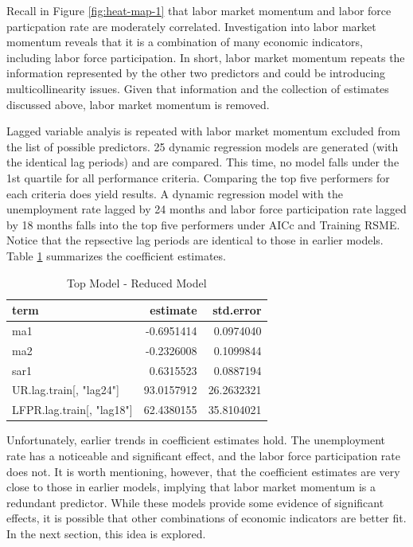 \documentclass[12pt,letterpaper,toc=flat,oneside]{report}
\theoremstyle{definition}
\theoremstyle{definition}
\theoremstyle{definition}
\theoremstyle{remark}
\begin{document}
Recall in Figure \ref{fig:heat-map-1} that labor market momentum and
labor force particpation rate are moderately correlated. Investigation
into labor market momentum reveals that it is a combination of many
economic indicators, including labor force participation. In short,
labor market momentum repeats the information represented by the other
two predictors and could be introducing multicollinearity issues. Given
that information and the collection of estimates discussed above, labor
market momentum is removed.

Lagged variable analyis is repeated with labor market momentum excluded
from the list of possible predictors. 25 dynamic regression models are
generated (with the identical lag periods) and are compared. This time,
no model falls under the 1st quartile for all performance criteria.
Comparing the top five performers for each criteria does yield results.
A dynamic regression model with the unemployment rate lagged by 24
months and labor force participation rate lagged by 18 months falls into
the top five performers under AICc and Training RSME. Notice that the
repsective lag periods are identical to those in earlier models. Table
\ref{tab:reduced-1} summarizes the coefficient estimates.

\begin{table}[!h]

\caption{\label{tab:reduced-1}Top Model - Reduced Model}
\centering
\begin{tabular}[t]{lrr}
\toprule
\bfseries{term} & \bfseries{estimate} & \bfseries{std.error}\\
\midrule
ma1 & -0.6951414 & 0.0974040\\
ma2 & -0.2326008 & 0.1099844\\
sar1 & 0.6315523 & 0.0887194\\
UR.lag.train[, "lag24"] & 93.0157912 & 26.2632321\\
LFPR.lag.train[, "lag18"] & 62.4380155 & 35.8104021\\
\bottomrule
\end{tabular}
\end{table}

Unfortunately, earlier trends in coefficient estimates hold. The
unemployment rate has a noticeable and significant effect, and the labor
force participation rate does not. It is worth mentioning, however, that
the coefficient estimates are very close to those in earlier models,
implying that labor market momentum is a redundant predictor. While
these models provide some evidence of significant effects, it is
possible that other combinations of economic indicators are better fit.
In the next section, this idea is explored.
\end{document}
